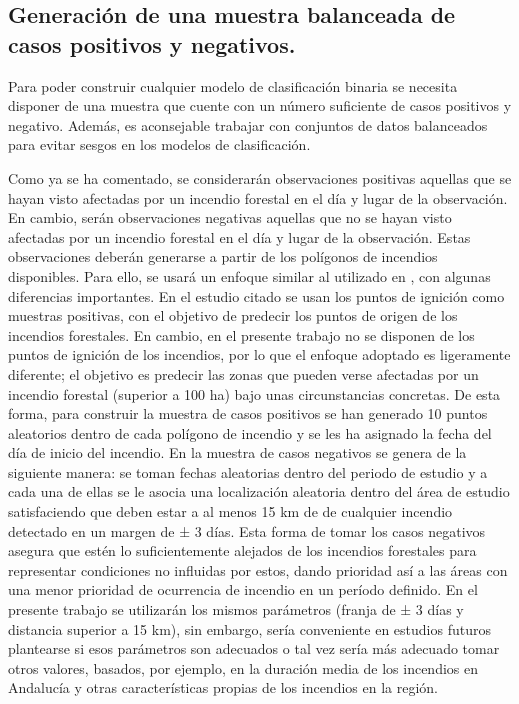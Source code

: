 \documentclass[12pt,a4paper,]{book}
\numberwithin{dummy}{section}
\theoremstyle{ocrenumbox}
\theoremstyle{blacknumex}
\theoremstyle{blacknumbox}
\theoremstyle{ocrenum}
\theoremstyle{ocrenum}
\begin{document}
\hypertarget{generaciuxf3n-de-una-muestra-balanceada-de-casos-positivos-y-negativos.}{%
\subsection{Generación de una muestra balanceada de casos positivos y
negativos.}\label{generaciuxf3n-de-una-muestra-balanceada-de-casos-positivos-y-negativos.}}

Para poder construir cualquier modelo de clasificación binaria se
necesita disponer de una muestra que cuente con un número suficiente de
casos positivos y negativo. Además, es aconsejable trabajar con
conjuntos de datos balanceados para evitar sesgos en los modelos de
clasificación. \citep{THABTAH2020429}

Como ya se ha comentado, se considerarán observaciones positivas
aquellas que se hayan visto afectadas por un incendio forestal en el día
y lugar de la observación. En cambio, serán observaciones negativas
aquellas que no se hayan visto afectadas por un incendio forestal en el
día y lugar de la observación. Estas observaciones deberán generarse a
partir de los polígonos de incendios disponibles. Para ello, se usará un
enfoque similar al utilizado en \citep{stojanova2012estimating}, con
algunas diferencias importantes. En el estudio citado se usan los puntos
de ignición como muestras positivas, con el objetivo de predecir los
puntos de origen de los incendios forestales. En cambio, en el presente
trabajo no se disponen de los puntos de ignición de los incendios, por
lo que el enfoque adoptado es ligeramente diferente; el objetivo es
predecir las zonas que pueden verse afectadas por un incendio forestal
(superior a 100 ha) bajo unas circunstancias concretas. De esta forma,
para construir la muestra de casos positivos se han generado 10 puntos
aleatorios dentro de cada polígono de incendio y se les ha asignado la
fecha del día de inicio del incendio. En \citet{stojanova2012estimating}
la muestra de casos negativos se genera de la siguiente manera: se toman
fechas aleatorias dentro del periodo de estudio y a cada una de ellas se
le asocia una localización aleatoria dentro del área de estudio
satisfaciendo que deben estar a al menos 15 km de de cualquier incendio
detectado en un margen de ± 3 días. Esta forma de tomar los casos
negativos asegura que estén lo suficientemente alejados de los incendios
forestales para representar condiciones no influidas por estos, dando
prioridad así a las áreas con una menor prioridad de ocurrencia de
incendio en un período definido. En el presente trabajo se utilizarán
los mismos parámetros (franja de ± 3 días y distancia superior a 15 km),
sin embargo, sería conveniente en estudios futuros plantearse si esos
parámetros son adecuados o tal vez sería más adecuado tomar otros
valores, basados, por ejemplo, en la duración media de los incendios en
Andalucía y otras características propias de los incendios en la región.
\end{document}
